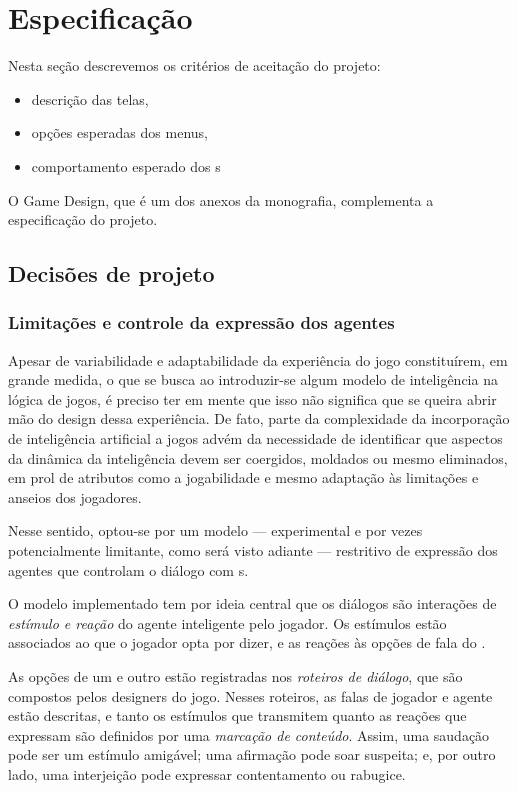 \chapter{Especificação}

Nesta seção descrevemos os critérios de aceitação do projeto:
\begin{itemize}
\item descrição das telas,
\item opções esperadas dos menus,
\item comportamento esperado dos \npc{}s
\end{itemize}

O Game Design, que é um dos anexos da monografia, complementa a
especificação do projeto.


\section{Decisões de projeto}

\subsection{Limitações e controle da expressão dos agentes}

Apesar de variabilidade e adaptabilidade da experiência do jogo
constituírem, em grande medida, o que se busca ao introduzir-se algum
modelo de inteligência na lógica de jogos, é preciso ter em mente que
isso não significa que se queira abrir mão do design dessa
experiência. De fato, parte da complexidade da incorporação de
inteligência artificial a jogos advém da necessidade de identificar
que aspectos da dinâmica da inteligência devem ser coergidos, moldados
ou mesmo eliminados, em prol de atributos como a jogabilidade e mesmo
adaptação às limitações e anseios dos jogadores.

Nesse sentido, optou-se por um modelo --- experimental e
por vezes potencialmente limitante, como será visto adiante ---
restritivo de expressão dos agentes que controlam o diálogo com
\npc{}s.

O modelo implementado tem por ideia central que os diálogos são
interações de \emph{estímulo e reação} do agente inteligente pelo
jogador. Os estímulos estão associados ao que o jogador opta por
dizer, e as reações às opções de fala do \npc. 

As opções de um e outro estão registradas nos \emph{roteiros de
  diálogo}, que são compostos pelos designers do jogo. Nesses
roteiros, as falas de jogador e agente estão descritas, e tanto os
estímulos que transmitem quanto as reações que expressam são definidos
por uma \emph{marcação de conteúdo}. Assim, uma saudação pode ser um
estímulo amigável; uma afirmação pode soar suspeita; e, por outro
lado, uma interjeição pode expressar contentamento ou rabugice.


